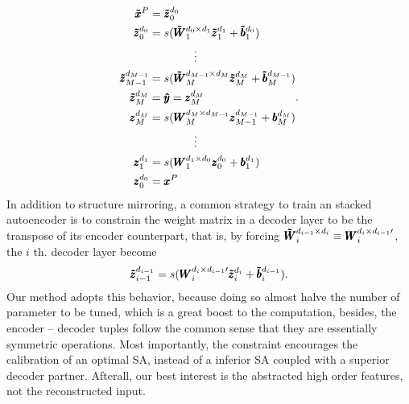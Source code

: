 \begin{equation} \label{eq:ED}
\begin{split}
  \pmb{\tilde{x}}^P &= {\pmb{\tilde{z}}_{0}^{d_{0}}} \\
  {\pmb{\tilde{z}}_{0  }^{d_{0  }}} &= s(\pmb{\tilde{W}}_{1  }^{d_{0  } \times d_{1  }} {\pmb{\tilde{z}}_{1  }^{d_{1  }}} + \pmb{\tilde{b}}_{1}^{d_{0  }}) \\
  & \quad \quad \quad \quad \vdots \\
  {\pmb{\tilde{z}}_{M-1}^{d_{M-1}}} &= s(\pmb{\tilde{W}}_{M  }^{d_{M-1} \times d_{M  }} {\pmb{\tilde{z}}_{M  }^{d_{M  }}} + \pmb{\tilde{b}}_{M}^{d_{M-1}}) \\
  {\pmb{\tilde{z}}_{M  }^{d_{M  }}} &= \pmb{\hat{y}} = {\pmb{z}_{M}^{d_{M}}} \\
  {\pmb{z}_{M  }^{d_{M  }}} &= s(\pmb{W}_{M  }^{d_{M  } \times d_{M-1}} {\pmb{z}_{M-1}^{d_{M-1}}} + \pmb{b}_{M}^{d_{M  }}) \\
  & \quad \quad \quad \quad \vdots \\
  {\pmb{z}_{1  }^{d_{1  }}} &= s(\pmb{W}_{1  }^{d_{1  } \times d_{0  }} {\pmb{z}_{0  }^{d_{0  }}} + \pmb{b}_{1}^{d_{1  }}) \\
  {\pmb{z}_{0  }^{d_{0  }}} &= \pmb{x}^P
\end{split}.
\end{equation}
In addition to structure mirroring, a common strategy to train an stacked  autoencoder is to constrain the weight matrix in a decoder layer to be the transpose of its encoder counterpart, that is, by forcing $\pmb{\tilde{W}}_{i}^{d_{i-1} \times d_{i}} \equiv \pmb{W}_{i}^{d_{i} \times d_{i-1}\prime}$, the $i$ th. decoder layer become
\begin{equation} \label{eq:CW}
  {\pmb{\tilde{z}}_{i-1}^{d_{i-1}}} = s(\pmb{W}_{i}^{d_{i} \times d_{i-1}\prime} {\pmb{\tilde{z}}_{i  }^{d_{i  }}} + \pmb{\tilde{b}}_{i  }^{d_{i-1}}).
\end{equation}
Our method adopts this behavior, because doing so almost halve the number of parameter to be tuned, which is a great boost to the computation, besides, the encoder -- decoder tuples follow the common sense that they are essentially symmetric operations. Most importantly, the constraint encourages the calibration of an optimal SA, instead of a inferior SA coupled with a superior decoder partner. Afterall, our best interest is the abstracted high order features, not the reconstructed input.

